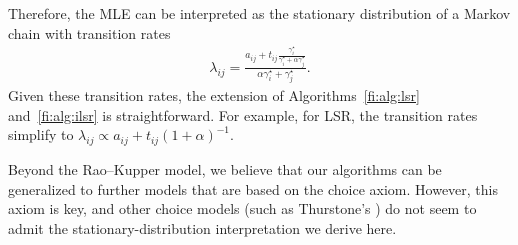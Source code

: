 Therefore, the MLE can be interpreted as the stationary distribution of a Markov chain with transition rates
\begin{align*}
\lambda_{ij} = \frac{a_{ij} + t_{ij}\tfrac{\gamma^\star_i}{\gamma^\star_i + \alpha \gamma^\star_j}}{\alpha \gamma^\star_i + \gamma^\star_j}.
\end{align*}
Given these transition rates, the extension of Algorithms~\ref{fi:alg:lsr} and~\ref{fi:alg:ilsr} is straightforward.
For example, for LSR, the transition rates simplify to $\lambda_{ij} \propto a_{ij} + t_{ij} (1 + \alpha)^{-1}$.

Beyond the Rao--Kupper model, we believe that our algorithms can be generalized to further models that are based on the choice axiom.
However, this axiom is key, and other choice models (such as Thurstone's \citeyearpar{thurstone1927law}) do not seem to admit the stationary-distribution interpretation we derive here.

